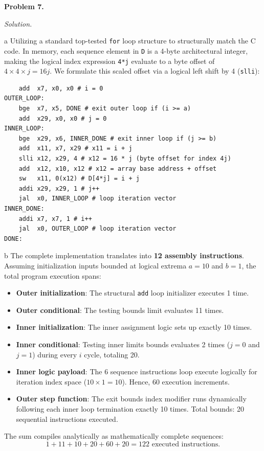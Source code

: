 \documentclass[11pt]{article}
\newcommand{\problem}[1]{\vspace{0.5em}\noindent\textbf{Problem #1.}\vspace{0.3em}}
\newenvironment{solution}{\par\noindent\textit{Solution.}}{\par\vspace{1em}}
\begin{document}
\problem{7}
\begin{solution}
    \begin{subproblem}{a}
        Utilizing a standard top-tested \texttt{for} loop structure to structurally match the C code. In memory, each sequence element in \texttt{D} is a 4-byte architectural integer, making the logical index expression \texttt{4*j} evaluate to a byte offset of $4 \times 4 \times j = 16j$. We formulate this scaled offset via a logical left shift by 4 (\texttt{slli}):
        \begin{verbatim}
    add  x7, x0, x0 # i = 0
OUTER_LOOP:
    bge  x7, x5, DONE # exit outer loop if (i >= a)
    add  x29, x0, x0 # j = 0
INNER_LOOP:
    bge  x29, x6, INNER_DONE # exit inner loop if (j >= b)
    add  x11, x7, x29 # x11 = i + j
    slli x12, x29, 4 # x12 = 16 * j (byte offset for index 4j)
    add  x12, x10, x12 # x12 = array base address + offset
    sw   x11, 0(x12) # D[4*j] = i + j
    addi x29, x29, 1 # j++
    jal  x0, INNER_LOOP # loop iteration vector
INNER_DONE:
    addi x7, x7, 1 # i++
    jal  x0, OUTER_LOOP # loop iteration vector
DONE:
        \end{verbatim}
    \end{subproblem}

    \begin{subproblem}{b}
        The complete implementation translates into \textbf{12 assembly instructions}. Assuming initialization inputs bounded at logical extrema $a=10$ and $b=1$, the total program execution spans:
        \begin{itemize}
            \item \textbf{Outer initialization}: The structural \texttt{add} loop initializer executes 1 time.
            \item \textbf{Outer conditional}: The testing bounds limit evaluates 11 times.
            \item \textbf{Inner initialization}: The inner assignment logic sets up exactly 10 times.
            \item \textbf{Inner conditional}: Testing inner limits bounds evaluates 2 times ($j=0$ and $j=1$) during every $i$ cycle, totaling 20.
            \item \textbf{Inner logic payload}: The 6 sequence instructions loop execute logically for iteration index space ($10 \times 1 = 10$). Hence, 60 execution increments.
            \item \textbf{Outer step function}: The exit bounds index modifier runs dynamically following each inner loop termination exactly 10 times. Total bounds: 20 sequential instructions executed.
        \end{itemize}
        The sum compiles analytically as mathematically complete sequences: 
        \[ 1 + 11 + 10 + 20 + 60 + 20 = 122 \text{ executed instructions.} \]
    \end{subproblem}
\end{solution}
\end{document}
